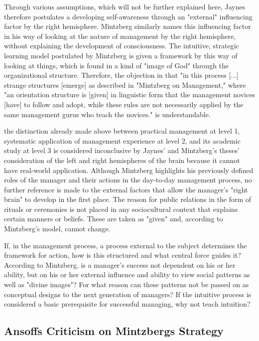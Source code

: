 \documentclass[a4paper,12pt]{article}
\begin{document}
Through various assumptions, which will not be further explained here, Jaynes
therefore postulates a developing self-awareness through an "external"
influencing factor by the right hemisphere. Mintzberg similarly names this
influencing factor in his way of looking at the nature of management by the
right hemisphere, without explaining the development of consciousness. The
intuitive, strategic learning model postulated by Mintzberg is given a
framework by this way of looking at things, which is found in a kind of "image
of God" through the organizational structure. Therefore, the objection in
\cite{seminar} that "in this process [...] strange structures [emerge] as
described in "Mintzberg on Management," where "an orientation structure is
[given] in linguistic form that the management novices [have] to follow and
adopt, while these rules are not necessarily applied by the same management
gurus who teach the novices." is understandable.

the distinction already made above between practical management at level 1,
systematic application of management experience at level 2, and its academic
study at level 3 is considered inconclusive by Jaynes' and Mintzberg's theses'
consideration of the left and right hemispheres of the brain because it cannot
have real-world application. Although Mintzberg highlights his previously
defined roles of the manager and their actions in the day-to-day management
process, no further reference is made to the external factors that allow the
manager's "right brain" to develop in the first place. The reason for public
relations in the form of rituals or ceremonies is not placed in any
sociocultural context that explains certain manners or beliefs. These are
taken as "given" and, according to Mintzberg's model, cannot change.

If, in the management process, a process external to the subject determines
the framework for action, how is this structured and what central force guides
it?  According to Mintzberg, is a manager's success not dependent on his or
her ability, but on his or her external influence and ability to view social
patterns as well as "divine images"? For what reason can these patterns not be
passed on as conceptual designs to the next generation of managers? If the
intuitive process is considered a basic prerequisite for successful managing,
why not teach intuition?

\subsection{Ansoffs Criticism on Mintzbergs Strategy}
\end{document}
